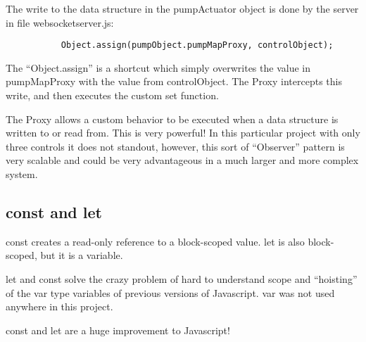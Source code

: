 The write to the data structure in the pumpActuator object is done by the 
server in file websocketserver.js:

\begin{verbatim}
           Object.assign(pumpObject.pumpMapProxy, controlObject);
\end{verbatim}

The ``Object.assign'' is a shortcut which simply overwrites the value in 
pumpMapProxy with the value from controlObject.  The Proxy intercepts this 
write, and then executes the custom set function.

The Proxy allows a custom behavior to be executed when a data structure is 
written to or read from.  This is very powerful!  In this particular project 
with only three controls it does not standout, however, this sort of 
``Observer'' pattern is very scalable and could be very advantageous in a much 
larger and more complex system.

\subsection{const and let}

const creates a read-only reference to a block-scoped value.
let is also block-scoped, but it is a variable.

let and const solve the crazy problem of hard to understand scope and 
``hoisting'' of the var type variables of previous versions of Javascript.
 var was not used anywhere in this project.
 
 const and let are a huge improvement to Javascript!



